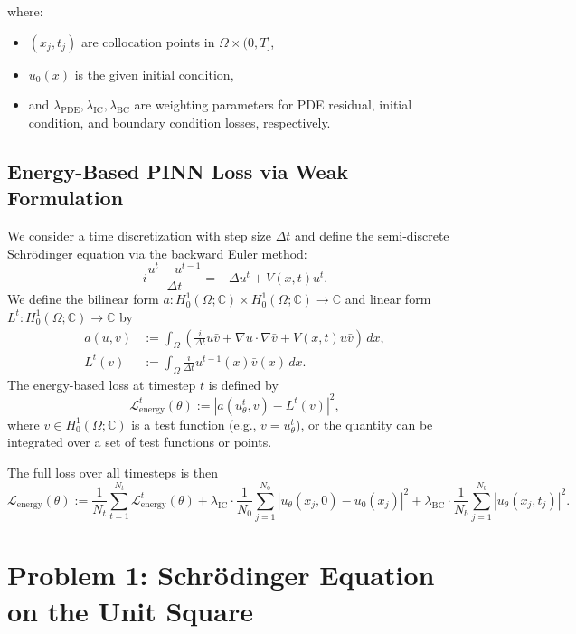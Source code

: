 \documentclass{article}
\theoremstyle{definition}
\theoremstyle{plain}
\theoremstyle{remark}
\begin{document}
where:
\begin{itemize}
  \item $(x_j, t_j)$ are collocation points in $\Omega \times (0,T]$,
  \item $u_0(x)$ is the given initial condition,
  \item and $\lambda_{\mathrm{PDE}}, \lambda_{\mathrm{IC}}, \lambda_{\mathrm{BC}}$ are weighting parameters for PDE residual, initial condition, and boundary condition losses, respectively.
\end{itemize}

\subsection*{Energy-Based PINN Loss via Weak Formulation}

We consider a time discretization with step size $\Delta t$ and define the semi-discrete Schrödinger equation via the backward Euler method:
\[
i \frac{u^t - u^{t-1}}{\Delta t} = -\Delta u^t + V(x,t) u^t.
\]
We define the bilinear form $a : H_0^1(\Omega; \mathbb{C}) \times H_0^1(\Omega; \mathbb{C}) \to \mathbb{C}$ and linear form $L^t : H_0^1(\Omega; \mathbb{C}) \to \mathbb{C}$ by
\begin{align*}
a(u, v) &:= \int_\Omega \left( \frac{i}{\Delta t} u \bar{v} + \nabla u \cdot \nabla \bar{v} + V(x,t) u \bar{v} \right) \, dx, \\
L^t(v) &:= \int_\Omega \frac{i}{\Delta t} u^{t-1}(x) \bar{v}(x) \, dx.
\end{align*}
The energy-based loss at timestep $t$ is defined by
\[
\mathcal{L}_{\text{energy}}^t(\theta) := \left| a(u_\theta^t, v) - L^t(v) \right|^2,
\]
where $v \in H_0^1(\Omega; \mathbb{C})$ is a test function (e.g., $v = u_\theta^t$), or the quantity can be integrated over a set of test functions or points.

The full loss over all timesteps is then
\[
\mathcal{L}_{\text{energy}}(\theta) := \frac{1}{N_t} \sum_{t=1}^{N_t} \mathcal{L}_{\text{energy}}^t(\theta)
+ \lambda_{\mathrm{IC}} \cdot \frac{1}{N_0} \sum_{j=1}^{N_0} \left| u_\theta(x_j, 0) - u_0(x_j) \right|^2
+ \lambda_{\mathrm{BC}} \cdot \frac{1}{N_b} \sum_{j=1}^{N_b} \left| u_\theta(x_j, t_j) \right|^2.
\]



\section{Problem 1: Schrödinger Equation on the Unit Square}
\end{document}
